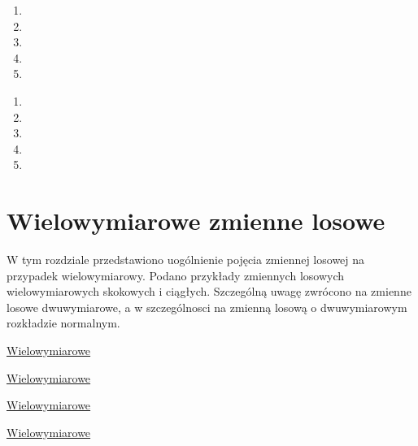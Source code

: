 \documentclass[
  letterpaper,
  DIV=11,
  numbers=noendperiod]{scrreprt}
\providecommand{\tightlist}{%
  \setlength{\itemsep}{0pt}\setlength{\parskip}{0pt}}\usepackage{longtable,booktabs,array}
\begin{document}
\begin{enumerate}
\def\labelenumi{\arabic{enumi}.}
\tightlist
\item
\item
\item
\item
\item
\end{enumerate}

\begin{tcolorbox}[enhanced jigsaw, toprule=.15mm, title={Pytania testowe}, breakable, coltitle=black, titlerule=0mm, colbacktitle=quarto-callout-important-color!10!white, opacitybacktitle=0.6, opacityback=0, bottomtitle=1mm, left=2mm, arc=.35mm, leftrule=.75mm, bottomrule=.15mm, rightrule=.15mm, toptitle=1mm, colframe=quarto-callout-important-color-frame, colback=white]

\end{tcolorbox}

\begin{enumerate}
\def\labelenumi{\arabic{enumi}.}
\tightlist
\item
\item
\item
\item
\item
\end{enumerate}


\chapter{Wielowymiarowe zmienne
losowe}\label{wielowymiarowe-zmienne-losowe}

W tym rozdziale przedstawiono uogólnienie pojęcia zmiennej losowej na
przypadek wielowymiarowy. Podano przykłady zmiennych losowych
wielowymiarowych skokowych i ciągłych. Szczególną uwagę zwrócono na
zmienne losowe dwuwymiarowe, a w szczególnosci na zmienną losową o
dwuwymiarowym rozkładzie normalnym.

\href{https://home.agh.edu.pl/~adan/wyklady/rpis4.pdf}{Wielowymiarowe}

\href{http://prac.im.pwr.wroc.pl/~wkosz/Probabilistyka7.pdf}{Wielowymiarowe}

\href{http://statystyka.rezolwenta.eu.org/Materialy/wielowymiarowe.pdf}{Wielowymiarowe}

\href{https://www.cs.put.poznan.pl/wkotlowski/mp/07_wielowymiarowe_zmienne_losowe.pdf}{Wielowymiarowe}
\end{document}
